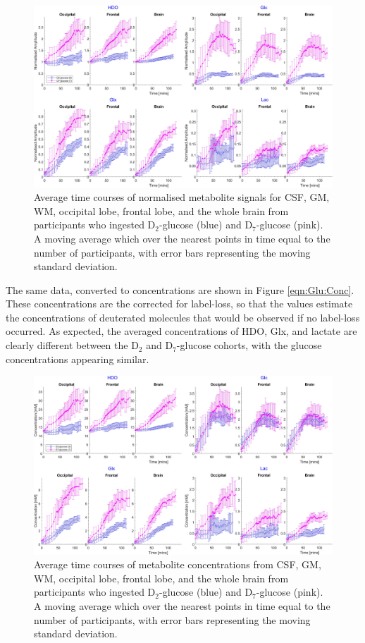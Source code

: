\documentclass[class=article, crop=false]{standalone}
\begin{document}
\begin{figure}
    \centering
    \includegraphics[width = 1\textwidth]{Figures/Glucose/Avg_Amp.png}
    \caption{Average time courses of normalised metabolite signals for CSF, GM, WM, occipital lobe, frontal lobe, and the whole brain from participants who ingested D$_2$-glucose (blue) and D$_7$-glucose (pink). A moving average which over the nearest points in time equal to the number of participants, with error bars representing the moving standard deviation.}
    \label{fig:Glu:Avg_Amp}
\end{figure}

The same data, converted to concentrations are shown in Figure \ref{eqn:Glu:Conc}. These concentrations are the corrected for label-loss, so that the values estimate the concentrations of deuterated molecules that would be observed if no label-loss occurred. As expected, the averaged concentrations of HDO, Glx, and lactate are clearly different between the D$_2$ and D$_7$-glucose cohorts, with the glucose concentrations appearing similar. 

\begin{figure}
    \centering
    \includegraphics[width = 1\textwidth]{Figures/Glucose/Avg_Conc.png}
    \caption{Average time courses of metabolite concentrations from CSF, GM, WM, occipital lobe, frontal lobe, and the whole brain from participants who ingested D$_2$-glucose (blue) and D$_7$-glucose (pink). A moving average which over the nearest points in time equal to the number of participants, with error bars representing the moving standard deviation.}
    \label{fig:Glu:Avg_Conc}
\end{figure}
\end{document}
